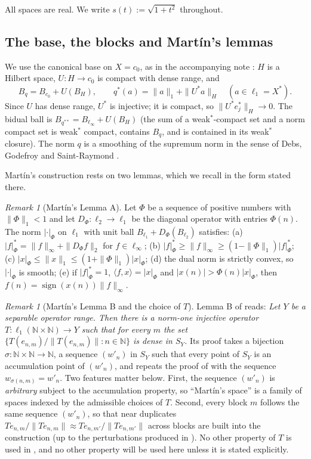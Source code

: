 \documentclass[10pt]{amsart}
\theoremstyle{definition}
\theoremstyle{remark}
\newtheorem{remark}[theorem]{Remark}
\newcommand{\sgn}{\operatorname{sign}}
\newcommand{\N}{\mathbb N}
\newcommand{\ip}[2]{\langle #1,#2\rangle}
\begin{document}
All spaces are real.  We write $s(t):=\sqrt{1+t^2}$ throughout.

\subsection{The base, the blocks and Mart\'in's lemmas}
We use the canonical base on $X=c_0$, as in the accompanying note
\cite{PrA}: $H$ is a Hilbert space, $U:H\to c_0$ is compact with dense
range, and
\[
 B_q=B_{c_0}+U(B_H),\qquad q^*(a)=\|a\|_1+\|U^*a\|_H\quad(a\in\ell_1=X^*).
\]
Since $U$ has dense range, $U^*$ is injective; it is compact, so
$\|U^*e_j^*\|_H\to0$.  The bidual ball is $B_{q^{**}}=B_{\ell_\infty}+U(B_H)$
(the sum of a weak$^*$-compact set and a norm compact set is weak$^*$
compact, contains $B_q$, and is contained in its weak$^*$ closure).  The
norm $q$ is a smoothing of the supremum norm in the sense of
Debs, Godefroy and Saint-Raymond \cite{DGS}.

Mart\'in's construction \cite{Martin} rests on two lemmas, which we recall
in the form stated there.

\begin{remark}[Mart\'in's Lemma A]\label{rem:lemmaA}
Let $\Phi$ be a sequence of positive numbers with $\|\Phi\|_1<1$ and let
$D_\Phi:\ell_2\to\ell_1$ be the diagonal operator with entries $\Phi(n)$.
The norm $|\cdot|_\Phi$ on $\ell_1$ with unit ball
$B_{\ell_1}+D_\Phi(B_{\ell_2})$ satisfies:
(a) $|f|_\Phi^*=\|f\|_\infty+\|D_\Phi f\|_2$ for $f\in\ell_\infty$;
(b) $|f|^*_\Phi\geq\|f\|_\infty\geq(1-\|\Phi\|_1)|f|^*_\Phi$;
(c) $|x|_\Phi\leq\|x\|_1\leq(1+\|\Phi\|_1)|x|_\Phi$;
(d) the dual norm is strictly convex, so $|\cdot|_\Phi$ is smooth;
(e) if $|f|^*_\Phi=1$, $\ip{f}{x}=|x|_\Phi$ and $|x(n)|>\Phi(n)|x|_\Phi$,
then $f(n)=\sgn(x(n))\|f\|_\infty$.
\end{remark}

\begin{remark}[Mart\'in's Lemma B and the choice of $T$]\label{rem:lemmaB}
Lemma B of \cite{Martin} reads: \emph{Let $Y$ be a separable operator
range.  Then there is a norm-one injective operator
$T:\ell_1(\N\times\N)\to Y$ such that for every $m$ the set
$\{T(e_{n,m})/\|T(e_{n,m})\|:n\in\N\}$ is dense in $S_Y$.}
Its proof takes a bijection $\sigma:\N\times\N\to\N$, a sequence
$(w'_n)$ in $S_Y$ such that every point of $S_Y$ is an accumulation point
of $(w'_n)$, and repeats the proof of \cite[Proposition~2.8]{KLMW20} with
the sequence $w_{\sigma(n,m)}=w'_n$.  Two features matter below.  First,
the sequence $(w'_n)$ is \emph{arbitrary} subject to the accumulation
property, so ``Mart\'in's space'' is a family of spaces indexed by the
admissible choices of $T$.  Second, every block $m$ follows the same
sequence $(w'_n)$, so that near duplicates $Te_{n,m}/\|Te_{n,m}\|\approx
Te_{n,m'}/\|Te_{n,m'}\|$ across blocks are built into the construction (up
to the perturbations produced in \cite{KLMW20}).  No other property of $T$
is used in \cite{Martin}, and no other property will be used here unless
it is stated explicitly.
\end{remark}
\end{document}
